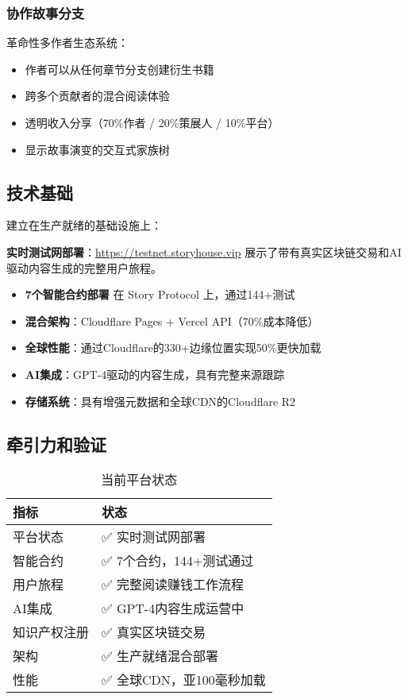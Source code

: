 \subsubsection{协作故事分支}
革命性多作者生态系统：
\begin{itemize}
    \item 作者可以从任何章节分支创建衍生书籍
    \item 跨多个贡献者的混合阅读体验
    \item 透明收入分享（70\%作者 / 20\%策展人 / 10\%平台）
    \item 显示故事演变的交互式家族树
\end{itemize}

\subsection{技术基础}

\storyhouse{} 建立在生产就绪的基础设施上：

\begin{keypoint}
\textbf{实时测试网部署}：\url{https://testnet.storyhouse.vip} 展示了带有真实区块链交易和AI驱动内容生成的完整用户旅程。
\end{keypoint}

\begin{itemize}
    \item \textbf{7个智能合约部署} 在 Story Protocol 上，通过144+测试
    \item \textbf{混合架构}：Cloudflare Pages + Vercel API（70\%成本降低）
    \item \textbf{全球性能}：通过Cloudflare的330+边缘位置实现50\%更快加载
    \item \textbf{AI集成}：GPT-4驱动的内容生成，具有完整来源跟踪
    \item \textbf{存储系统}：具有增强元数据和全球CDN的Cloudflare R2
\end{itemize}

\subsection{牵引力和验证}

\begin{table}[H]
\centering
\caption{当前平台状态}
\label{tab:platform-status}
\begin{tabular}{@{}ll@{}}
\toprule
\textbf{指标} & \textbf{状态} \\
\midrule
平台状态 & ✅ 实时测试网部署 \\
智能合约 & ✅ 7个合约，144+测试通过 \\
用户旅程 & ✅ 完整阅读赚钱工作流程 \\
AI集成 & ✅ GPT-4内容生成运营中 \\
知识产权注册 & ✅ 真实区块链交易 \\
架构 & ✅ 生产就绪混合部署 \\
性能 & ✅ 全球CDN，亚100毫秒加载 \\
\bottomrule
\end{tabular}
\end{table}


